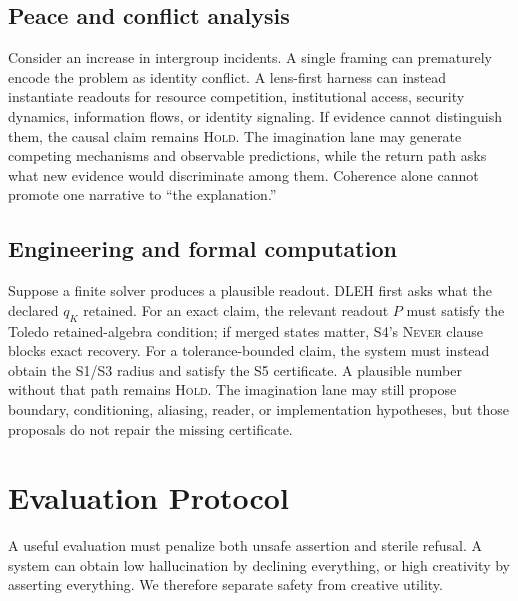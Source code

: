 \documentclass[10pt,twocolumn]{article}
\begin{document}
\subsection{Peace and conflict analysis}
Consider an increase in intergroup incidents. A single framing can prematurely encode the problem as identity conflict. A lens-first harness can instead instantiate readouts for resource competition, institutional access, security dynamics, information flows, or identity signaling. If evidence cannot distinguish them, the causal claim remains \textsc{Hold}. The imagination lane may generate competing mechanisms and observable predictions, while the return path asks what new evidence would discriminate among them. Coherence alone cannot promote one narrative to ``the explanation.''

\subsection{Engineering and formal computation}
Suppose a finite solver produces a plausible readout. DLEH first asks what the declared $q_K$ retained. For an exact claim, the relevant readout $P$ must satisfy the Toledo retained-algebra condition; if merged states matter, S4's \textsc{Never} clause blocks exact recovery. For a tolerance-bounded claim, the system must instead obtain the S1/S3 radius and satisfy the S5 certificate. A plausible number without that path remains \textsc{Hold}. The imagination lane may still propose boundary, conditioning, aliasing, reader, or implementation hypotheses, but those proposals do not repair the missing certificate.

\section{Evaluation Protocol}
A useful evaluation must penalize both unsafe assertion and sterile refusal. A system can obtain low hallucination by declining everything, or high creativity by asserting everything. We therefore separate safety from creative utility.
\end{document}
